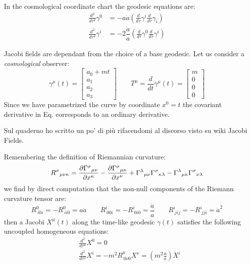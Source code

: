\documentclass[Main]{subfiles}
\begin{document}
			In the cosmological coordinate chart the geodesic equations are:
			\begin{eqnarray}
				\frac{d^2}{d \tau^2} \gamma^0 &= - a \dot{a} \left( \frac{d}{d \tau} \gamma^i \frac{d}{d \tau}\gamma_i \right) \label{FRWJacobi1}\\
				\frac{d^2}{d \tau^2} \gamma^i &= - 2 \dfrac{\dot{a}}{a} \left( \frac{d}{d \tau} \gamma^0 \frac{d}{d \tau}\gamma^i \right) 		\label{FRWJacobi2}	
			\end{eqnarray}
			
			Jacobi fields are dependant from the choice of a base geodesic. 
			Let us consider a \emph{cosmological} observer:
			\begin{displaymath}
				\gamma^\mu (t) = \begin{bmatrix}  a_0 + m t \\  a_1 \\ a_2 \\ a_3  \end{bmatrix}
				\qquad
				T^\mu=\frac{d}{d t}\gamma^\mu(t)= \begin{bmatrix}  m \\  0 \\ 0 \\ 0  \end{bmatrix}
			\end{displaymath}
			Since we have parametrized the curve by coordinate $x^0 = t$ the covariant derivative in Eq. \label{JacobiEquationComponents}  corresponds to an ordinary derivative.
\ifToninus
	\begin{Warning}
		Sul quaderno ho scritto un po' di più rifacendomi al discorso visto su wiki Jacobi Fields.
	\end{Warning}
\fi
			Remembering the definition of Riemannian curvature:
			\begin{displaymath}
				{R^\sigma}_{\mu\nu\kappa} =
				  {\partial{\Gamma^\sigma}_{\mu\nu} \over \partial x^\kappa} -
				  {\partial{\Gamma^\sigma}_{\mu\kappa} \over \partial x^\nu} +
				  {\Gamma^\lambda}_{\mu\nu}{\Gamma^\sigma}_{\kappa\lambda} -
				  {\Gamma^\lambda}_{\mu\kappa}{\Gamma^\sigma}_{\nu\lambda}		
			\end{displaymath}			 
			we find by direct computation  that the non-null components of the Riemann curvature tensor are:
			\begin{equation}
				R^0_{\: i 0 i}= - R^{0}_{\: i i 0}= a \ddot{a} \qquad
				R^i_{\: 0 0 i}=-R^i_{\: 0 i 0}=	\dfrac{\ddot{a}}{a}\qquad
				R^i_{\: j i j} = - R^i_{\: j j i} = \dot{a}^2				
			\end{equation}
			then a Jacobi $X^\mu(t)$ along the time-like geodesic $\gamma(t)$ satisfies the following uncoupled homogeneous equations:
			\begin{eqnarray}
				&\frac{d^2}{d \tau^2} X^0 = 0 \\
				&\frac{d^2}{d \tau^2} X^i = - m^2 R^{\mu}_{\: 0 \nu 0} X^\nu = \left( m^2 \frac{\ddot{a}}{a}\right) X^i 			
			\end{eqnarray}	
			\vspace{2mm}
			
\end{document}
